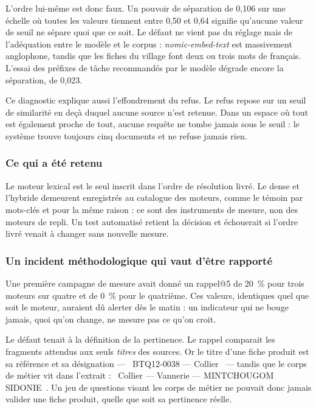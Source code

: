 L'ordre lui-même est donc faux. Un pouvoir de séparation de 0,106 sur une échelle où toutes les valeurs tiennent entre 0,50 et 0,64 signifie qu'aucune valeur de seuil ne sépare quoi que ce soit. Le défaut ne vient pas du réglage mais de l'adéquation entre le modèle et le corpus : \emph{nomic-embed-text} est massivement anglophone, tandis que les fiches du village font deux ou trois mots de français. L'essai des préfixes de tâche recommandés par le modèle dégrade encore la séparation, de 0,023.

Ce diagnostic explique aussi l'effondrement du refus. Le refus repose sur un seuil de similarité en deçà duquel aucune source n'est retenue. Dans un espace où tout est également proche de tout, aucune requête ne tombe jamais sous le seuil : le système trouve toujours cinq documents et ne refuse jamais rien.

\subsubsection{Ce qui a été retenu}

Le moteur lexical est le seul inscrit dans l'ordre de résolution livré. Le dense et l'hybride demeurent enregistrés au catalogue des moteurs, comme le témoin par mots-clés et pour la même raison : ce sont des instruments de mesure, non des moteurs de repli. Un test automatisé retient la décision et échouerait si l'ordre livré venait à changer sans nouvelle mesure.

\subsubsection{Un incident méthodologique qui vaut d'être rapporté}

Une première campagne de mesure avait donné un rappel@5 de 20~\% pour trois moteurs sur quatre et de 0~\% pour le quatrième. Ces valeurs, identiques quel que soit le moteur, auraient dû alerter dès le matin : un indicateur qui ne bouge jamais, quoi qu'on change, ne mesure pas ce qu'on croit.

Le défaut tenait à la définition de la pertinence. Le rappel comparait les fragments attendus aux seuls \emph{titres} des sources. Or le titre d'une fiche produit est sa référence et sa désignation --- \guillemotleft~BTQ12-0038 --- Collier~\guillemotright{} --- tandis que le corps de métier vit dans l'extrait : \guillemotleft~Collier --- Vannerie --- MINTCHOUGOM SIDONIE~\guillemotright. Un jeu de questions visant les corps de métier ne pouvait donc jamais valider une fiche produit, quelle que soit sa pertinence réelle.

